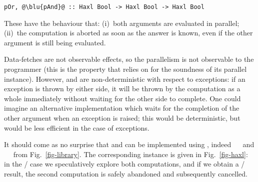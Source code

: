 \begin{verbatim}
pOr, @\blu{pAnd}@ :: Haxl Bool -> Haxl Bool -> Haxl Bool
\end{verbatim}

\noindent
These have the behaviour that: (i)~both arguments are evaluated in parallel;
(ii)~the computation is aborted as soon as the answer is known, even if the
other argument is still being evaluated.

Data-fetches are not observable effects, so the parallelism is not
observable to the programmer (this is the property that \Haxl relies
on for the soundness of its parallel 
instance). However,  and  are non-deterministic with
respect to exceptions: if an exception is thrown by either side, it
will be thrown by the computation as a whole immediately without
waiting for the other side to complete.  One could imagine an
alternative implementation which waits for the completion of the other
argument when an exception is raised; this would be deterministic, but
would be less efficient in the case of exceptions.

It should come as no surprise that  and  can be
implemented using , indeed ~\hs{=}~\hs{(<||>)} and
~\hs{=}~\hs{(<&&>)} from Fig.~\ref{fig-library}. The corresponding
 instance is given in Fig.~\ref{fig-haxl}: in the
/ case we speculatively explore both computations,
and if we obtain a / result, the second computation is
safely abandoned and subsequently cancelled.

